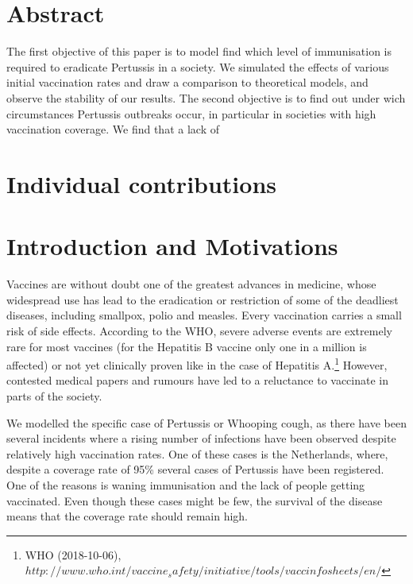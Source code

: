 \documentclass[11pt]{article}
\begin{document}

\tableofcontents

\newpage




\section{Abstract}
The first objective of this paper is to model find which level of immunisation is required to eradicate Pertussis in a society. We simulated the effects of various initial vaccination rates and draw a comparison to theoretical models, and observe the stability of our results. 
The second objective is to find out under wich circumstances Pertussis outbreaks occur, in particular in societies with high vaccination coverage. We find that a lack of  

\section{Individual contributions}

\section{Introduction and Motivations}

Vaccines are without doubt one of the greatest advances in medicine, whose widespread use has lead to the eradication or restriction of some of the deadliest diseases, including smallpox, polio and measles. Every vaccination carries a small risk of side effects. According to the WHO, severe adverse events are extremely rare for most vaccines (for the Hepatitis B vaccine only one in a million is affected) or not yet clinically proven like in the case of Hepatitis A.\footnote{WHO (2018-10-06), $http://www.who.int/vaccine_safety/initiative/tools/vaccinfosheets/en/$}  However, contested medical papers and rumours have led to a reluctance to vaccinate in parts of the society.

\vspace{14px}

We modelled the specific case of Pertussis or Whooping cough, as there have been several incidents where a rising number of infections have been observed despite relatively high vaccination rates. One of these cases is the Netherlands, where, despite a coverage rate of 95\% several cases of Pertussis have been registered. One of the reasons is waning immunisation and the lack of people getting vaccinated. Even though these cases might be few, the survival of the disease means that the coverage rate should remain high. 
\end{document}

